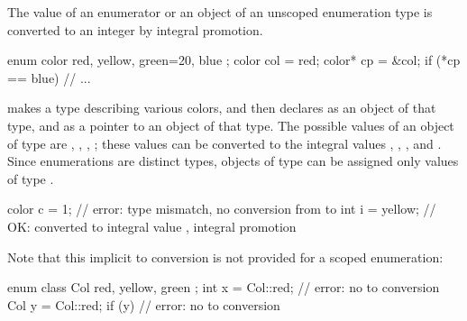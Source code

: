 \pnum
The value of an enumerator or an object of an unscoped enumeration type is
converted to an integer by integral promotion.
\begin{example}
\begin{codeblock}
  enum color { red, yellow, green=20, blue };
  color col = red;
  color* cp = &col;
  if (*cp == blue)              // ...
\end{codeblock}
makes  a type describing various colors, and then declares
 as an object of that type, and  as a pointer to an
object of that type. The possible values of an object of type
 are , , ,
; these values can be converted to the integral values
, , , and . Since enumerations are
distinct types, objects of type  can be assigned only
values of type .
\begin{codeblock}
color c = 1;                    // error: type mismatch, no conversion from  to 
int i = yellow;                 // OK:  converted to integral value , integral promotion
\end{codeblock}
Note that this implicit  to 
conversion is not provided for a scoped enumeration:
\begin{codeblock}
enum class Col { red, yellow, green };
int x = Col::red;               // error: no  to  conversion
Col y = Col::red;
if (y) { }                      // error: no  to  conversion
\end{codeblock}
\end{example}

